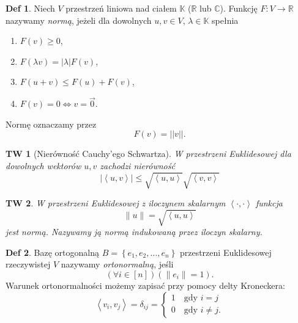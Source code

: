 \documentclass[a4paper, 12pt]{mwart}
\theoremstyle{definition}
\newtheorem{definicja}{Def}[section]
\theoremstyle{plain}
\newtheorem{twierdzenie}{TW}[section]
\theoremstyle{remark}
\begin{document}
\begin{definicja}
	Niech $V$ \ppauza przestrzeń liniowa nad ciałem $\mathbb{K}$ ($\mathbb{R}$ lub $\mathbb{C}$). Funkcję $F:V \to \mathbb{R}$ nazywamy \emph{normą}, jeżeli dla dowolnych $u, v \in V$, $\lambda \in \mathbb{K}$ spełnia
	\begin{enumerate}
		\item $F(v) \geq 0$,
		\item $F(\lambda v) = |\lambda|F(v)$,
		\item $F(u+v) \leq F(u) + F(v)$,
		\item $F(v) = 0 \iff v = \vec 0$.
	\end{enumerate}
	Normę oznaczamy przez
	\begin{equation}
		F(v) = ||v||.
	\end{equation}
\end{definicja}
\begin{twierdzenie}[Nierówność Cauchy'ego \ppauza Schwartza]
	W przestrzeni Euklidesowej dla dowolnych wektorów $u, v$ zachodzi nierówność\begin{equation}
		|\left< u, v \right>| \leq \sqrt{\left< u, u \right>} \sqrt{\left< v, v \right>}
	\end{equation}
\end{twierdzenie}
\begin{twierdzenie}
	W przestrzeni Euklidesowej z iloczynem skalarnym $\left< \cdot, \cdot \right>$ funkcja
	\begin{equation}
		\|u\| = \sqrt{\left< u, u \right>}
	\end{equation}
	jest normą. Nazywamy ją normą \emph{indukowaną} przez iloczyn skalarny.
\end{twierdzenie}
\begin{definicja}
	Bazę ortogonalną $B = \left\{e_1, e_2, \ldots, e_n\right\}$ przestrzeni Euklidesowej rzeczywistej $V$ nazywamy \emph{ortonormalną}, jeśli
	\begin{equation}
		\left(\forall i \in [n]\right)\left(\|e_i\| = 1\right).
	\end{equation}
	Warunek ortonormalności możemy zapisać przy pomocy delty Kroneckera:
	\begin{equation}
		\left< v_i, v_j \right> = \delta_{ij} = 
		\begin{cases}
			1 \quad \text{gdy } i = j \\
			0 \quad \text{gdy } i \neq j.
		\end{cases}
	\end{equation}
\end{definicja}
\end{document}
